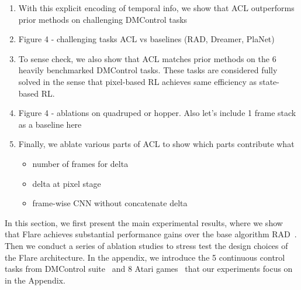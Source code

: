 \documentclass{article} \usepackage{iclr2021_conference,times}
\begin{document}
\begin{enumerate}

    \item With this explicit encoding of temporal info, we show that ACL outperforms prior methods on challenging DMControl tasks 
    \item Figure 4 - challenging tasks ACL vs baselines (RAD, Dreamer, PlaNet) 
    \item To sense check, we also show that ACL matches prior methods on the 6 heavily benchmarked DMControl tasks. These tasks are considered fully solved in the sense that  pixel-based RL achieves same efficiency as state-based RL. 
    \item Figure 4 - ablations on quadruped or hopper. Also let's include 1 frame stack as a baseline here
    \item Finally, we ablate various parts of ACL to show which parts contribute what
        \begin{itemize}
            \item number of frames for delta
            \item delta at pixel stage
            \item frame-wise CNN without concatenate delta
        \end{itemize}
\end{enumerate}
\fi


In this section, we first present the main experimental results, where we show that Flare achieves substantial performance gains over the base algorithm RAD~\citep{laskin_lee2020rad}. Then we conduct a series of ablation studies to stress test the design choices of the Flare architecture.
In the appendix, we introduce the 5 continuous control tasks from DMControl suite~\citep{tassa2018deepmind} and 8 Atari games~\citep{bellemare2013arcade} that our experiments focus on in the Appendix.
\vspace{-3mm}
\iffalse
\end{document}
